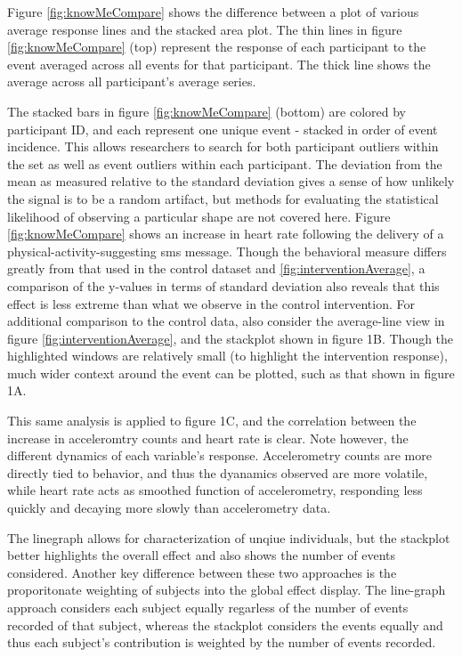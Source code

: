Figure \ref{fig:knowMeCompare} shows the difference between a plot of various average response lines and the stacked area plot.
The thin lines in figure \ref{fig:knowMeCompare} (top) represent the response of each participant to the event averaged across all events for that participant.
The thick line shows the average across all participant’s average series.

The stacked bars in figure \ref{fig:knowMeCompare} (bottom) are colored by participant ID, and each represent one unique event - stacked in order of event incidence.
This allows researchers to search for both participant outliers within the set as well as event outliers within each participant.
The deviation from the mean as measured relative to the standard deviation gives a sense of how unlikely the signal is to be a random artifact, but methods for evaluating the statistical likelihood of observing a particular shape are not covered here.
Figure \ref{fig:knowMeCompare} shows an increase in heart rate following the delivery of a physical-activity-suggesting sms message.
Though the behavioral measure differs greatly from that used in the control dataset and \ref{fig:interventionAverage}, a comparison of the y-values in terms of standard deviation also reveals that this effect is less extreme than what we observe in the control intervention.
For additional comparison to the control data, also consider the average-line view in figure \ref{fig:interventionAverage}, and the stackplot shown in figure 1B.
Though the highlighted windows are relatively small (to highlight the intervention response), much wider context around the event can be plotted, such as that shown in figure 1A.

This same analysis is applied to figure 1C, and the correlation between the increase in acceleromtry counts and heart rate is clear.
Note however, the different dynamics of each variable's response.
Accelerometry counts are more directly tied to behavior, and thus the dyanamics observed are more volatile, while heart rate acts as smoothed function of accelerometry, responding less quickly and decaying more slowly than accelerometry data.

The linegraph allows for characterization of unqiue individuals, but the stackplot better highlights the overall effect and also shows the number of events considered.
Another key difference between these two approaches is the proporitonate weighting of subjects into the global effect display.
The line-graph approach considers each subject equally regarless of the number of events recorded of that subject, whereas the stackplot considers the events equally and thus each subject's contribution is weighted by the number of events recorded.

